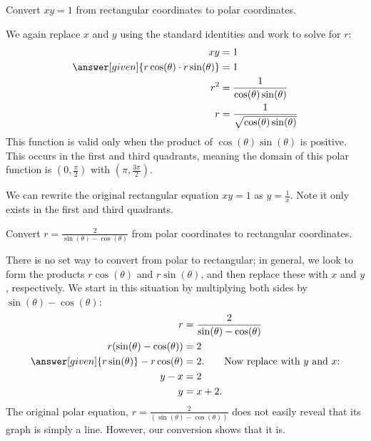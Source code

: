 \documentclass{ximera}
\begin{document}
\begin{example}
  Convert $xy = 1$ from rectangular coordinates to polar coordinates.
  \begin{explanation}
    We again replace $x$ and $y$ using the standard identities and
    work to solve for $r$:
    \begin{align*}
	xy &= 1 \\
	\answer[given]{r\cos(\theta)\cdot r\sin(\theta)} & = 1\\
	r^2 & = \frac{1}{\cos(\theta)\sin(\theta)}\\
	r & = \frac{1}{\sqrt{\cos(\theta)\sin(\theta)}}\\
    \end{align*}
    This function is valid only when the product of
    $\cos(\theta) \sin(\theta)$ is positive. This occurs in the first and
    third quadrants, meaning the domain of this polar function is
    $(0,\tfrac{\pi}{2})$ with $(\pi,\tfrac{3\pi}{2})$.
      
    We can rewrite the original rectangular equation $xy=1$ as
    $y=\frac{1}{x}$. Note it only exists in the first and third quadrants.
  \end{explanation}
\end{example}





\begin{example}
   Convert $r=\frac{2}{\sin(\theta)-\cos(\theta)}$ from polar coordinates
   to rectangular coordinates.
   \begin{explanation}
     There is no set way to convert from polar to rectangular; in
     general, we look to form the products $r\cos(\theta)$ and
     $r\sin(\theta)$, and then replace these with $x$ and $y$,
     respectively. We start in this situation by multiplying both sides
     by $\sin(\theta)-\cos(\theta)$:
     \begin{align*}
       r &= \frac{2}{\sin(\theta)-\cos(\theta)} \\
       r(\sin(\theta)-\cos(\theta)) &= 2\\
       \answer[given]{r\sin(\theta)}-r\cos(\theta) &= 2. \qquad \text{Now replace with $y$ and $x$:}\\
       y-x &= 2\\
	  y &= x+2.
     \end{align*}
     The original polar equation, $r=\frac{2}{(\sin(\theta)-\cos(\theta))}$ does
     not easily reveal that its graph is simply a line. However, our
     conversion shows that it is.
   \end{explanation}
\end{example}
\end{document}

